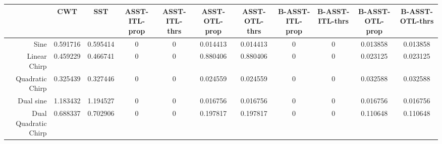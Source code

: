 \begin{tabular}{|r|c|c|c|c|c|c|c|c|c|c|}
\toprule
 & CWT & SST & ASST-ITL-prop & ASST-ITL-thrs & ASST-OTL-prop & ASST-OTL-thrs & B-ASST-ITL-prop & B-ASST-ITL-thrs & B-ASST-OTL-prop & B-ASST-OTL-thrs \\
\midrule
Sine & 0.591716 & 0.595414 & 0 & 0 & 0.014413 & 0.014413 & 0 & 0 & 0.013858 & 0.013858 \\
Linear Chirp & 0.459229 & 0.466741 & 0 & 0 & 0.880406 & 0.880406 & 0 & 0 & 0.023125 & 0.023125 \\
Quadratic Chirp & 0.325439 & 0.327446 & 0 & 0 & 0.024559 & 0.024559 & 0 & 0 & 0.032588 & 0.032588 \\
Dual sine & 1.183432 & 1.194527 & 0 & 0 & 0.016756 & 0.016756 & 0 & 0 & 0.016756 & 0.016756 \\
Dual Quadratic Chirp & 0.688337 & 0.702906 & 0 & 0 & 0.197817 & 0.197817 & 0 & 0 & 0.110648 & 0.110648 \\
\bottomrule
\end{tabular}

